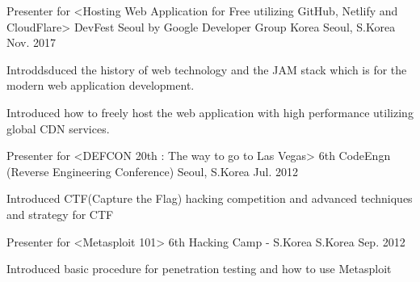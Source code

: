 

\begin{cventries}

  \cventry
    {Presenter for <Hosting Web Application for Free utilizing GitHub, Netlify and CloudFlare>} %
    {DevFest Seoul by Google Developer Group Korea} %
    {Seoul, S.Korea} %
    {Nov. 2017} %
    {
      \begin{cvitems} %
        \item {Introddsduced the history of web technology and the JAM stack which is for the modern web application development.}
        \item {Introduced how to freely host the web application with high performance utilizing global CDN services.}
      \end{cvitems}
    }

  \cventry
    {Presenter for <DEFCON 20th : The way to go to Las Vegas>} %
    {6th CodeEngn (Reverse Engineering Conference)} %
    {Seoul, S.Korea} %
    {Jul. 2012} %
    {
      \begin{cvitems} %
        \item {Introduced CTF(Capture the Flag) hacking competition and advanced techniques and strategy for CTF}
      \end{cvitems}
    }

  \cventry
    {Presenter for <Metasploit 101>} %
    {6th Hacking Camp - S.Korea} %
    {S.Korea} %
    {Sep. 2012} %
    {
      \begin{cvitems} %
        \item {Introduced basic procedure for penetration testing and how to use Metasploit}
      \end{cvitems}
    }

\end{cventries}
